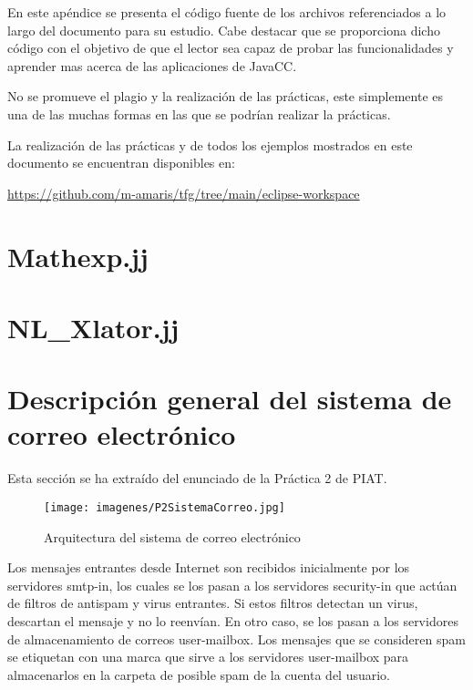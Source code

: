 
En este apéndice se presenta el código fuente de los archivos referenciados a lo largo del documento para su estudio. Cabe destacar que se proporciona dicho código con el objetivo de que el lector sea capaz de probar las funcionalidades y aprender mas acerca de las aplicaciones de JavaCC.

No se promueve el plagio y la realización de las prácticas, este simplemente es una de las muchas formas en las que se podrían realizar la prácticas.

La realización de las prácticas y de todos los ejemplos mostrados en este documento se encuentran disponibles en:

\href{https://github.com/m-amaris/tfg/tree/main/eclipse-workspace}{https://github.com/m-amaris/tfg/tree/main/eclipse-workspace}

\pagestyle{empty}


\section{Mathexp.jj}
\label{sec:mathexp}
\lstset{inputencoding=utf8/latin1}


\newpage
\section{NL\_Xlator.jj}
\label{sec:nlxlator}
\lstset{inputencoding=utf8/latin1}


\newpage
\section{Descripción general del sistema de correo electrónico}
\label{sec:P2SistemaCorreo}

\noindent Esta sección se ha extraído del enunciado de la Práctica 2 de PIAT.

\begin{figure}[H]
	\centering
	\texttt{[image: imagenes/P2SistemaCorreo.jpg]}
	\caption{\label{fig:P2SistemaCorreo.jpg}Arquitectura del sistema de correo electrónico\cite{pdfpractica2} }
\end{figure}

\noindent Los mensajes entrantes desde Internet son recibidos inicialmente por los servidores smtp-in, los cuales se los pasan a los servidores security-in que actúan de filtros de antispam y virus entrantes. Si estos filtros detectan un virus, descartan el mensaje y no lo reenvían. En otro caso, se los pasan a los servidores de almacenamiento de correos user-mailbox. Los mensajes que se consideren spam se etiquetan con una marca que sirve a los servidores user-mailbox para almacenarlos en la carpeta de posible spam de la cuenta del usuario.

